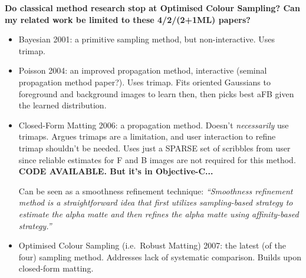 \documentclass{article}
\begin{document}
\begin{multicols}{2}[]
\textbf{Do classical method research stop at Optimised Colour Sampling? Can my related work be limited to these 4/2/(2+1ML) papers?}


\begin{itemize}
    \item Bayesian 2001: a primitive sampling method, but non-interactive. Uses trimap.
    \item Poisson 2004: an improved propagation method, interactive (seminal propagation method paper?). Uses trimap. Fits oriented Gaussians to foreground and background images to learn then, then picks best aFB given the learned distribution.
\end{itemize}
\begin{itemize}
    \item Closed-Form Matting 2006: a propagation method. Doesn't \emph{necessarily} use trimaps. Argues trimaps are a limitation, and user interaction to refine trimap shouldn't be needed. Uses just a SPARSE set of scribbles from user since reliable estimates for F and B images are not required for this method. \textbf{CODE AVAILABLE. But it's in Objective-C...}

    Can be seen as a smoothness refinement technique: \emph{``Smoothness refinement method is a straightforward idea that first utilizes sampling-based strategy to estimate the alpha matte and then refines the alpha matte using affinity-based strategy.''}
    \item Optimised Colour Sampling (i.e.\ Robust Matting) 2007: the latest (of the four) sampling method.  Addresses lack of systematic comparison. Builds upon closed-form matting.
\end{itemize}



\end{multicols}
\end{document}
